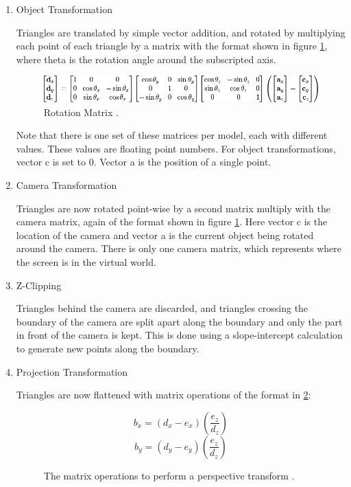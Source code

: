 \documentclass[onecolumn]{IEEEtran}
\begin{document}
\begin{enumerate}
\item Object Transformation

Triangles are translated by simple vector addition, and rotated by multiplying each point of each triangle by a matrix with the format shown in figure \ref{fig:matrices}, where theta is the rotation angle around the subscripted axis.

\begin{figure}[H]
	\centering
	\includegraphics[width=1.0\textwidth]{matrices.png}
	\caption{Rotation Matrix \cite{3dProjection}.}
	\label{fig:matrices}
\end{figure}

Note that there is one set of these matrices per model, each with different values.  These values are floating point numbers.  For object transformations, vector c is set to 0.  Vector a is the position of a single point.

\item Camera Transformation

Triangles are now rotated point-wise by a second matrix multiply with the camera matrix, again of the format shown in figure \ref{fig:matrices}.  Here vector c is the location of the camera and vector a is the current object being rotated around the camera.   There is only one camera matrix, which represents where the screen is in the virtual world.

\item Z-Clipping

Triangles behind the camera are discarded, and triangles crossing the boundary of the camera are split apart along the boundary and only the part in front of the camera is kept.  This is done using a slope-intercept calculation to generate new points along the boundary.

\item Projection Transformation

Triangles are now flattened with matrix operations of the format in \ref{fig:projectionMat}:

\begin{figure}[H]
	\centering
	$$b_x = (d_x - e_x)(\frac{e_z}{d_z})$$
	$$b_y = (d_y - e_y)(\frac{e_z}{d_z})$$
	\caption{The matrix operations to perform a perspective transform \cite{3dProjection}.}
	\label{fig:projectionMat}
\end{figure}


\end{enumerate}
\end{document}
